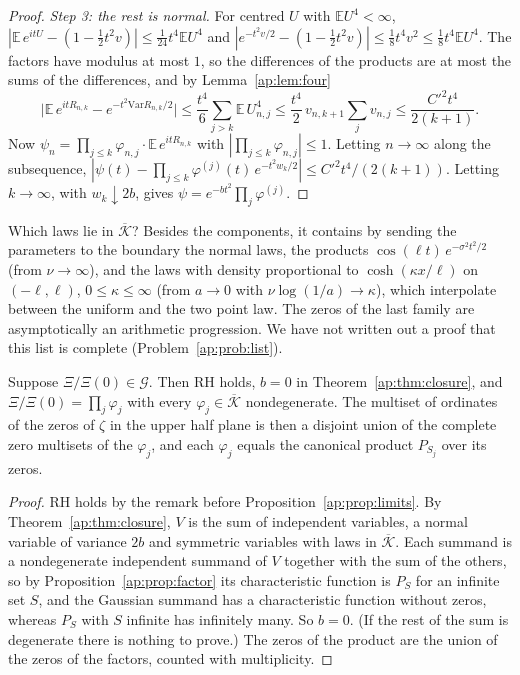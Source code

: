 \begin{proof}
\emph{Step 3: the rest is normal.} For centred $U$ with $\mathbb E U^4<\infty$, $|\mathbb E\,e^{itU}-(1-\frac12t^2v)|\le\frac1{24}t^4\mathbb E U^4$ and $|e^{-t^2v/2}-(1-\frac12t^2v)|\le\frac18t^4v^2\le\frac18t^4\mathbb E U^4$. The factors have modulus at most $1$, so the differences of the products are at most the sums of the differences, and by Lemma~\ref{ap:lem:four}
\[
\big|\mathbb E\,e^{itR_{n,k}}-e^{-t^2\mathrm{Var}R_{n,k}/2}\big|\le\frac{t^4}6\sum_{j>k}\mathbb E\,U_{n,j}^4\le\frac{t^4}2\,v_{n,k+1}\sum_jv_{n,j}\le\frac{C'^2t^4}{2(k+1)} .
\]
Now $\psi_n=\prod_{j\le k}\varphi_{n,j}\cdot\mathbb E\,e^{itR_{n,k}}$ with $|\prod_{j\le k}\varphi_{n,j}|\le1$. Letting $n\to\infty$ along the subsequence, $|\psi(t)-\prod_{j\le k}\varphi^{(j)}(t)\,e^{-t^2w_k/2}|\le C'^2t^4/(2(k+1))$. Letting $k\to\infty$, with $w_k\downarrow2b$, gives $\psi=e^{-bt^2}\prod_j\varphi^{(j)}$.
\end{proof}

Which laws lie in $\overline{\mathcal K}$? Besides the components, it contains by sending the parameters to the boundary the normal laws, the products $\cos(\ell t)\,e^{-\sigma^2t^2/2}$ (from $\nu\to\infty$), and the laws with density proportional to $\cosh(\kappa x/\ell)$ on $(-\ell,\ell)$, $0\le\kappa\le\infty$ (from $a\to0$ with $\nu\log(1/a)\to\kappa$), which interpolate between the uniform and the two point law. The zeros of the last family are asymptotically an arithmetic progression. We have not written out a proof that this list is complete (Problem~\ref{ap:prob:list}).

\begin{corollary}[rigidity]\label{ap:cor:rigid}
Suppose $\Xi/\Xi(0)\in\mathcal G$. Then RH holds, $b=0$ in Theorem~\ref{ap:thm:closure}, and $\Xi/\Xi(0)=\prod_j\varphi_j$ with every $\varphi_j\in\overline{\mathcal K}$ nondegenerate. The multiset of ordinates of the zeros of $\zeta$ in the upper half plane is then a disjoint union of the complete zero multisets of the $\varphi_j$, and each $\varphi_j$ equals the canonical product $P_{S_j}$ over its zeros.
\end{corollary}

\begin{proof}
RH holds by the remark before Proposition~\ref{ap:prop:limits}. By Theorem~\ref{ap:thm:closure}, $V$ is the sum of independent variables, a normal variable of variance $2b$ and symmetric variables with laws in $\overline{\mathcal K}$. Each summand is a nondegenerate independent summand of $V$ together with the sum of the others, so by Proposition~\ref{ap:prop:factor} its characteristic function is $P_S$ for an infinite set $S$, and the Gaussian summand has a characteristic function without zeros, whereas $P_S$ with $S$ infinite has infinitely many. So $b=0$. (If the rest of the sum is degenerate there is nothing to prove.) The zeros of the product are the union of the zeros of the factors, counted with multiplicity.
\end{proof}

